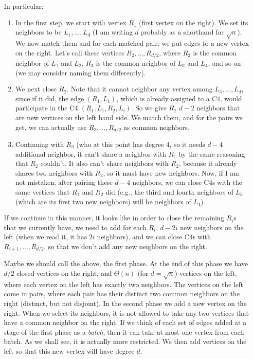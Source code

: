 \documentclass{article}
\begin{document}
In particular:
\begin{enumerate}
\item In the first step, we start with vertex $R_1$ (first vertex on the right). We set its neighbors to be $L_1,\dots,L_d$ (I am writing $d$ probably as a shorthand for $\sqrt{n}$). We now match them and for each matched pair, we put edges to a new vertex on the right. Let's call these vertices $R_2,\dots,R_{d/2}$, where $R_2$ is the common neighbor of $L_1$ and $L_2$, $R_3$ is the common neighbor of $L_3$ and $L_4$, and so on (we may consider naming them differently).
\item We next close $R_2$. Note that it cannot neighbor any vertex among $L_3,\dots,L_d$, since if it did, the edge $(R_1,L_1)$, which is already assigned to a C4, would participate in the C4 $(R_1,L_1,R_2,L_i)$. So we give $R_2$ $d-2$ neighbors that are new vertices on the left hand side. We match them, and for the pairs we get, we can actually use $R_3,\dots,R_{d/2}$ as common neighbors.
\item Continuing with $R_3$ (who at this point has degree 4, so it needs $d-4$ additional neighbor, it can't share a neighbor with $R_1$ by the same reasoning that $R_2$ couldn't. It also can't share neighbors with $R_2$, because it already shares two neighbors with $R_2$, so it must have new neighbors. Now, if I am not mistaken, after pairing these $d-4$ neighbors, we can close C4s with the same vertices that $R_1$ and $R_2$ did (e.g., the third and fourth neighbors of $L_3$ (which are its first two new neighbors) will be neighbors of $L_4$).
\end{enumerate}
If we continue in this manner, it looks like in order to close the remaining $R_i$s that we currently have, we need to add for each $R_i$, $d-2i$ new neighbors on the left (when we read it, it has $2i$ neighbors), and we can close C4s with $R_{i+1},\dots,R_{d/2}$, so that we don't add any new neighbors on the right.

Maybe we should call the above, the first phase. At the end of this phase we have $d/2$ closed vertices on the right, and $\Theta(n)$ (for $d=\sqrt{n}$) vertices on the left, where each vertex on the left has exactly two neighbors. The vertices on the left come in pairs, where each pair has their distinct two common neighbors on the right (distinct, but not disjoint). In the second phase we add a new vertex on the right. When we select its neighbors, it is not allowed to take any two vertices that have a common neighbor on the right. If we think of each set of edges added at a stage of the first phase as a \emph{batch}, then it can take at most one vertex from each batch. As we shall see, it is actually more restricted. We then add vertices on the left so that this new vertex will have degree $d$.
\end{document}
